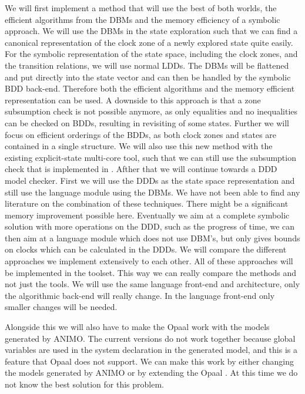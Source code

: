 We will first implement a method that will use the best of both worlds, the efficient algorithms from the DBMs and the memory efficiency of a symbolic approach. We will use the DBMs in the state exploration such that we can find a canonical representation of the clock zone of a newly explored state quite easily. For the symbolic representation of the state space, including the clock zones, and the transition relations, we will use normal LDDs. The DBMs will be flattened and put directly into the state vector and can then be handled by the symbolic BDD back-end. Therefore both the efficient algorithms and the memory efficient representation can be used. A downside to this approach is that a zone subsumption check is not possible anymore, as only equalities and no inequalities can be checked on BDDs, resulting in revisiting of some states. Further we will focus on efficient orderings of the BDDs, as both clock zones and states are contained in a single structure. We will also use this new method with the existing explicit-state multi-core tool, such that we can still use the subsumption check that is implemented in \ltsmin{}. Afther that we will continue towards a DDD model checker. First we will use the DDDs as the state space representation and still use the language module using the DBMs. We have not been able to find any literature on the combination of these techniques. There might be a significant memory improvement possible here. Eventually we aim at a complete symbolic solution with more operations on the DDD, such as the progress of time, we can then aim at a language module which does not use DBM's, but only gives bounds on clocks which can be calculated in the DDDs. We will compare the different approaches we implement extensively to each other. All of these approaches will be implemented in the \ltsmin{} toolset. This way we can really compare the methods and not just the tools. We will use the same language front-end and architecture, only the algorithmic back-end will really change. In the language front-end only smaller changes will be needed.

Alongside this we will also have to make the Opaal \pins{} work with the \uppaal{} models generated by ANIMO. The current versions do not work together because global variables are used in the system declaration in the generated model, and this is a feature that Opaal does not support. We can make this work by either changing the models generated by ANIMO or by extending the Opaal \pins{}. At this time we do not know the best solution for this problem.



